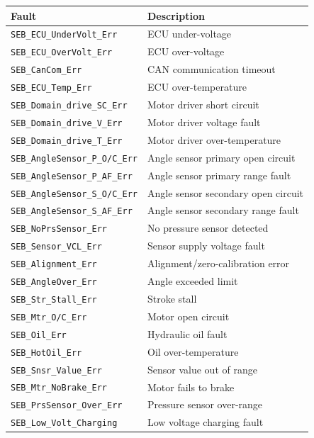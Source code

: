 \documentclass[12pt,a4paper,oneside]{report}
\begin{document}
\begin{longtable}[]{@{}ll@{}}
\toprule\noalign{}
Fault & Description \\
\midrule\noalign{}
\endhead
\bottomrule\noalign{}
\endlastfoot
\texttt{SEB\_ECU\_UnderVolt\_Err} & ECU under-voltage \\
\texttt{SEB\_ECU\_OverVolt\_Err} & ECU over-voltage \\
\texttt{SEB\_CanCom\_Err} & CAN communication timeout \\
\texttt{SEB\_ECU\_Temp\_Err} & ECU over-temperature \\
\texttt{SEB\_Domain\_drive\_SC\_Err} & Motor driver short circuit \\
\texttt{SEB\_Domain\_drive\_V\_Err} & Motor driver voltage fault \\
\texttt{SEB\_Domain\_drive\_T\_Err} & Motor driver over-temperature \\
\texttt{SEB\_AngleSensor\_P\_O/C\_Err} & Angle sensor primary open circuit \\
\texttt{SEB\_AngleSensor\_P\_AF\_Err} & Angle sensor primary range fault \\
\texttt{SEB\_AngleSensor\_S\_O/C\_Err} & Angle sensor secondary open circuit \\
\texttt{SEB\_AngleSensor\_S\_AF\_Err} & Angle sensor secondary range fault \\
\texttt{SEB\_NoPrsSensor\_Err} & No pressure sensor detected \\
\texttt{SEB\_Sensor\_VCL\_Err} & Sensor supply voltage fault \\
\texttt{SEB\_Alignment\_Err} & Alignment/zero-calibration error \\
\texttt{SEB\_AngleOver\_Err} & Angle exceeded limit \\
\texttt{SEB\_Str\_Stall\_Err} & Stroke stall \\
\texttt{SEB\_Mtr\_O/C\_Err} & Motor open circuit \\
\texttt{SEB\_Oil\_Err} & Hydraulic oil fault \\
\texttt{SEB\_HotOil\_Err} & Oil over-temperature \\
\texttt{SEB\_Snsr\_Value\_Err} & Sensor value out of range \\
\texttt{SEB\_Mtr\_NoBrake\_Err} & Motor fails to brake \\
\texttt{SEB\_PrsSensor\_Over\_Err} & Pressure sensor over-range \\
\texttt{SEB\_Low\_Volt\_Charging} & Low voltage charging fault \\
\end{longtable}
\end{document}
